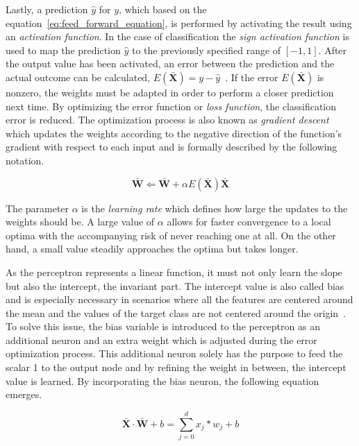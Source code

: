 \documentclass[draft,final]{vutinfth} %
\begin{document}
    Lastly, a prediction $\hat{y}$ for $y$, which based on the equation~\eqref{eq:feed_forward_equation}, is performed by activating the result using an \textit{activation function}.
    In the case of classification the \textit{sign activation function} is used to map the prediction $\hat{y}$ to the previously specified range of $[-1,1]$.
    After the output value has been activated, an error between the prediction and the actual outcome can be calculated, $E(\bar{\mathbf{X}}) = y - \hat{y}$~\citep{aggarwal_neural_2018}.
    If the error $E(\bar{\mathbf{X}})$ is nonzero, the weights must be adapted in order to perform a closer prediction next time.
    By optimizing the error function or \textit{loss function}, the classification error is reduced.
    The optimization process is also known as \textit{gradient descent} which updates the weights according to the negative direction of the function's gradient with respect to each input and is formally described by the following notation.

    \begin{equation}
        \bar{\mathbf{W}} \Leftarrow \bar{\mathbf{W}} + \alpha E(\bar{\mathbf{X}})\bar{\mathbf{X}}\label{eq:weight_adjusting}
    \end{equation}

    The parameter $\alpha$ is the \textit{learning rate} which defines how large the updates to the weights should be.
    A large value of $\alpha$ allows for faster convergence to a local optima with the accompanying risk of never reaching one at all.
    On the other hand, a small value steadily approaches the optima but takes longer.


    As the perceptron represents a linear function, it must not only learn the slope but also the intercept, the invariant part.
    The intercept value is also called bias and is especially necessary in scenarios where all the features are centered around the mean and the values of the target class are not centered around the origin~\citep{aggarwal_neural_2018}.
    To solve this issue, the bias variable is introduced to the perceptron as an additional neuron and an extra weight which is adjusted during the error optimization process.
    This additional neuron solely has the purpose to feed the scalar 1 to the output node and by refining the weight in between, the intercept value is learned.
    By incorporating the bias neuron, the following equation emerges.

    \begin{equation}
        \bar{\mathbf{X}}\cdot\bar{\mathbf{W}} + b=\sum_{j=0}^{d}x_j*w_j + b\label{eq:linear_function_equation}
    \end{equation}
\end{document}
